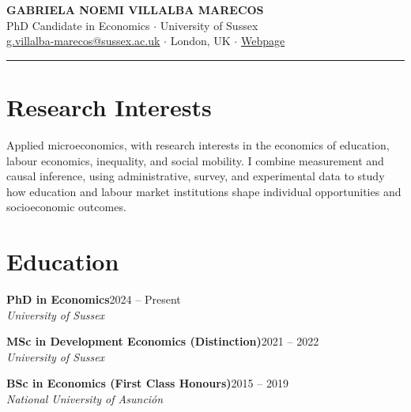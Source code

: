 \documentclass[10pt,a4paper]{article}
\newcommand{\entry}[3]{%
  \textbf{#1}\hfill{\color{muted}#2}\\
  {\small\itshape\color{muted}#3}\par\vspace{0.2ex}}
\begin{document}
\begin{center}
  {\LARGE\bfseries GABRIELA NOEMI VILLALBA MARECOS}\\[0.6ex]
  {\color{accent}PhD Candidate in Economics $\cdot$ University of Sussex}\\[0.4ex]
  {\small \href{mailto:g.villalba-marecos@sussex.ac.uk}{g.villalba-marecos@sussex.ac.uk} $\cdot$ London, UK $\cdot$
  \href{https://gn-villalba.github.io/GNVM-website/index.html}{\color{accent}Webpage}}
\end{center}
\vspace{-1ex}
{\color{accent}\rule{\linewidth}{0.8pt}}
\vspace{0.4ex}

\section{Research Interests}
{\small Applied microeconomics, with research interests in the economics of education, labour economics, inequality, and social mobility. I combine measurement and causal inference, using administrative, survey, and experimental data to study how education and labour market institutions shape individual opportunities and socioeconomic outcomes.}

\section{Education}
\entry{PhD in Economics}{2024 -- Present}{University of Sussex}
\entry{MSc in Development Economics \textmd{(Distinction)}}{2021 -- 2022}{University of Sussex}
\entry{BSc in Economics \textmd{(First Class Honours)}}{2015 -- 2019}{National University of Asunción}

\end{document}
